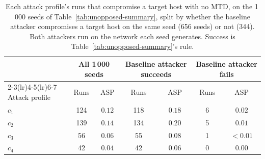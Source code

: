 
\begin{table}[htbp]
\centering
\caption[Each attack profile's successes, split by the baseline attacker's]{Each attack profile's runs that compromise a target host with no MTD, on the 1\,000 seeds of Table~\ref{tab:unopposed-summary}, split by whether the baseline attacker compromises a target host on the same seed (656 seeds) or not (344). Both attackers run on the network each seed generates. Success is Table~\ref{tab:unopposed-summary}'s rule.}
\label{tab:fa-success}
\tablestyle
\begin{tabular}{@{}l *{6}{c}@{}}
\toprule
& \multicolumn{2}{c}{All 1\,000 seeds} & \multicolumn{2}{c}{Baseline attacker succeeds} & \multicolumn{2}{c}{Baseline attacker fails} \\
\cmidrule(lr){2-3}\cmidrule(lr){4-5}\cmidrule(lr){6-7}
Attack profile & Runs & ASP & Runs & ASP & Runs & ASP \\
\midrule
$c_1$ & 124 & $0.12$ & 118 & $0.18$ & 6 & $0.02$ \\
$c_2$ & 139 & $0.14$ & 134 & $0.20$ & 5 & $0.01$ \\
$c_3$ & 56 & $0.06$ & 55 & $0.08$ & 1 & ${<}0.01$ \\
$c_4$ & 42 & $0.04$ & 42 & $0.06$ & 0 & $0.00$ \\
\bottomrule
\end{tabular}
\end{table}
